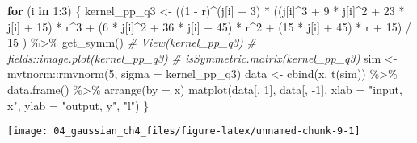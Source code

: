 \documentclass[
]{article}
\newenvironment{Shaded}{\begin{snugshade}}{\end{snugshade}}
\newcommand{\AttributeTok}[1]{\textcolor[rgb]{0.77,0.63,0.00}{#1}}
\newcommand{\CommentTok}[1]{\textcolor[rgb]{0.56,0.35,0.01}{\textit{#1}}}
\newcommand{\ControlFlowTok}[1]{\textcolor[rgb]{0.13,0.29,0.53}{\textbf{#1}}}
\newcommand{\DecValTok}[1]{\textcolor[rgb]{0.00,0.00,0.81}{#1}}
\newcommand{\FunctionTok}[1]{\textcolor[rgb]{0.00,0.00,0.00}{#1}}
\newcommand{\NormalTok}[1]{#1}
\newcommand{\OtherTok}[1]{\textcolor[rgb]{0.56,0.35,0.01}{#1}}
\newcommand{\SpecialCharTok}[1]{\textcolor[rgb]{0.00,0.00,0.00}{#1}}
\newcommand{\StringTok}[1]{\textcolor[rgb]{0.31,0.60,0.02}{#1}}
\begin{document}
\begin{Shaded}
\begin{Highlighting}[]
\ControlFlowTok{for}\NormalTok{ (i }\ControlFlowTok{in} \DecValTok{1}\SpecialCharTok{:}\DecValTok{3}\NormalTok{) \{}
\NormalTok{  kernel\_pp\_q3 }\OtherTok{\textless{}{-}}\NormalTok{ ((}\DecValTok{1} \SpecialCharTok{{-}}\NormalTok{ r)}\SpecialCharTok{\^{}}\NormalTok{(j[i] }\SpecialCharTok{+} \DecValTok{3}\NormalTok{) }\SpecialCharTok{*}
\NormalTok{    ((j[i]}\SpecialCharTok{\^{}}\DecValTok{3} \SpecialCharTok{+} \DecValTok{9} \SpecialCharTok{*}\NormalTok{ j[i]}\SpecialCharTok{\^{}}\DecValTok{2} \SpecialCharTok{+} \DecValTok{23} \SpecialCharTok{*}\NormalTok{ j[i] }\SpecialCharTok{+} \DecValTok{15}\NormalTok{) }\SpecialCharTok{*}\NormalTok{ r}\SpecialCharTok{\^{}}\DecValTok{3} \SpecialCharTok{+}
\NormalTok{       (}\DecValTok{6} \SpecialCharTok{*}\NormalTok{ j[i]}\SpecialCharTok{\^{}}\DecValTok{2} \SpecialCharTok{+} \DecValTok{36} \SpecialCharTok{*}\NormalTok{ j[i] }\SpecialCharTok{+} \DecValTok{45}\NormalTok{) }\SpecialCharTok{*}\NormalTok{ r}\SpecialCharTok{\^{}}\DecValTok{2} \SpecialCharTok{+}
\NormalTok{       (}\DecValTok{15} \SpecialCharTok{*}\NormalTok{ j[i] }\SpecialCharTok{+} \DecValTok{45}\NormalTok{) }\SpecialCharTok{*}\NormalTok{ r }\SpecialCharTok{+} 
       \DecValTok{15}\NormalTok{) }\SpecialCharTok{/} \DecValTok{15}\NormalTok{ ) }\SpecialCharTok{\%\textgreater{}\%} \FunctionTok{get\_symm}\NormalTok{()}
  \CommentTok{\# View(kernel\_pp\_q3)}
  \CommentTok{\# fields::image.plot(kernel\_pp\_q3)}
  \CommentTok{\# isSymmetric.matrix(kernel\_pp\_q3)}
\NormalTok{  sim }\OtherTok{\textless{}{-}}\NormalTok{ mvtnorm}\SpecialCharTok{::}\FunctionTok{rmvnorm}\NormalTok{(}\DecValTok{5}\NormalTok{, }\AttributeTok{sigma =}\NormalTok{ kernel\_pp\_q3)}
\NormalTok{  data }\OtherTok{\textless{}{-}} \FunctionTok{cbind}\NormalTok{(x, }\FunctionTok{t}\NormalTok{(sim)) }\SpecialCharTok{\%\textgreater{}\%}
    \FunctionTok{data.frame}\NormalTok{() }\SpecialCharTok{\%\textgreater{}\%}
    \FunctionTok{arrange}\NormalTok{(}\AttributeTok{by =}\NormalTok{ x)}
  \FunctionTok{matplot}\NormalTok{(data[, }\DecValTok{1}\NormalTok{], data[, }\SpecialCharTok{{-}}\DecValTok{1}\NormalTok{], }\AttributeTok{xlab =} \StringTok{"input, x"}\NormalTok{, }\AttributeTok{ylab =} \StringTok{"output, y"}\NormalTok{, }\StringTok{"l"}\NormalTok{)}
\NormalTok{\}}
\end{Highlighting}
\end{Shaded}

\begin{center}\texttt{[image: 04\_gaussian\_ch4\_files/figure-latex/unnamed-chunk-9-1]} \end{center}
\end{document}
